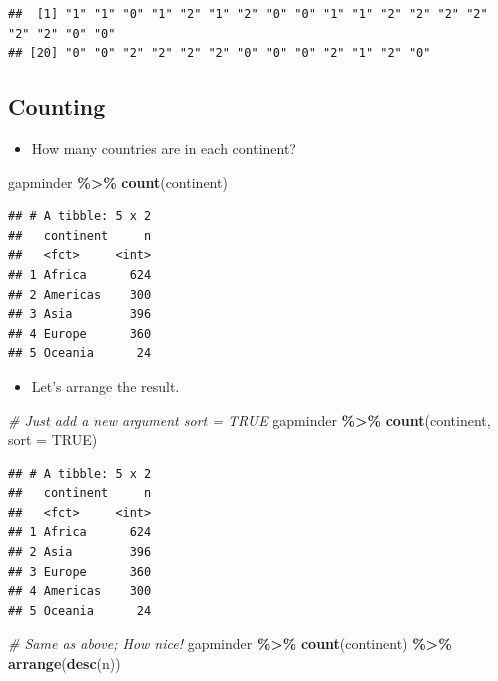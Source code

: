 \documentclass[
]{book}
\newenvironment{Shaded}{\begin{snugshade}}{\end{snugshade}}
\newcommand{\AttributeTok}[1]{\textcolor[rgb]{0.13,0.29,0.53}{#1}}
\newcommand{\CommentTok}[1]{\textcolor[rgb]{0.56,0.35,0.01}{\textit{#1}}}
\newcommand{\ConstantTok}[1]{\textcolor[rgb]{0.56,0.35,0.01}{#1}}
\newcommand{\FunctionTok}[1]{\textcolor[rgb]{0.13,0.29,0.53}{\textbf{#1}}}
\newcommand{\NormalTok}[1]{#1}
\newcommand{\SpecialCharTok}[1]{\textcolor[rgb]{0.81,0.36,0.00}{\textbf{#1}}}
\providecommand{\tightlist}{%
  \setlength{\itemsep}{0pt}\setlength{\parskip}{0pt}}
\begin{document}
\begin{verbatim}
##  [1] "1" "1" "0" "1" "2" "1" "2" "0" "0" "1" "1" "2" "2" "2" "2" "2" "2" "0" "0"
## [20] "0" "0" "2" "2" "2" "2" "0" "0" "0" "2" "1" "2" "0"
\end{verbatim}

\subsection{Counting}\label{counting}

\begin{itemize}
\tightlist
\item
  How many countries are in each continent?
\end{itemize}

\begin{Shaded}
\begin{Highlighting}[]
\NormalTok{gapminder }\SpecialCharTok{\%\textgreater{}\%}
  \FunctionTok{count}\NormalTok{(continent)}
\end{Highlighting}
\end{Shaded}

\begin{verbatim}
## # A tibble: 5 x 2
##   continent     n
##   <fct>     <int>
## 1 Africa      624
## 2 Americas    300
## 3 Asia        396
## 4 Europe      360
## 5 Oceania      24
\end{verbatim}

\begin{itemize}
\tightlist
\item
  Let's arrange the result.
\end{itemize}

\begin{Shaded}
\begin{Highlighting}[]
\CommentTok{\# Just add a new argument \textasciigrave{}sort = TRUE\textasciigrave{}}
\NormalTok{gapminder }\SpecialCharTok{\%\textgreater{}\%}
  \FunctionTok{count}\NormalTok{(continent, }\AttributeTok{sort =} \ConstantTok{TRUE}\NormalTok{)}
\end{Highlighting}
\end{Shaded}

\begin{verbatim}
## # A tibble: 5 x 2
##   continent     n
##   <fct>     <int>
## 1 Africa      624
## 2 Asia        396
## 3 Europe      360
## 4 Americas    300
## 5 Oceania      24
\end{verbatim}

\begin{Shaded}
\begin{Highlighting}[]
\CommentTok{\# Same as above; How nice!}
\NormalTok{gapminder }\SpecialCharTok{\%\textgreater{}\%}
  \FunctionTok{count}\NormalTok{(continent) }\SpecialCharTok{\%\textgreater{}\%}
  \FunctionTok{arrange}\NormalTok{(}\FunctionTok{desc}\NormalTok{(n))}
\end{Highlighting}
\end{Shaded}
\end{document}
